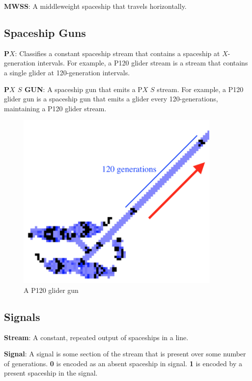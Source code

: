 \documentclass{article}
\begin{document}
\noindent\textbf{MWSS}: A middleweight spaceship that travels horizontally.

\vspace{1em}
\subsection{Spaceship Guns}
\noindent\textbf{P$X$}: Classifies a constant spaceship stream that contains a spaceship at $X$-generation intervals. For example, a P120 glider stream is a stream that contains a single glider at 120-generation intervals.

\vspace{1em}

\noindent\textbf{P$X$ $S$ GUN}: A spaceship gun that emits a P$X$ $S$ stream. For example, a P120 glider gun is a spaceship gun that emits a glider every 120-generations, maintaining a P120 glider stream.

\vspace{1em}

\begin{figure}[h]
\centering
\includegraphics[width=10cm,keepaspectratio]{images/P120-GUN.png}
\captionsetup{labelformat=empty} \caption{A P120 glider gun}
\end{figure}
\subsection{Signals}
\noindent\textbf{Stream}: A constant, repeated output of spaceships in a line.

\vspace{1em}

\noindent\textbf{Signal}: A signal is some section of the stream that is present over some number of generations. \textbf{0} is encoded as an absent spaceship in signal. \textbf{1} is encoded by a present spaceship in the signal.
\end{document}
